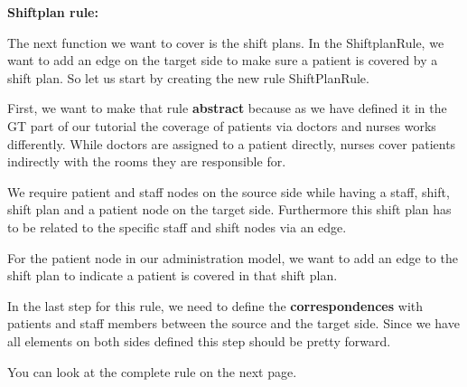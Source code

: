 \textbf{Shiftplan rule:}

The next function we want to cover is the shift plans. In the \textsf{ShiftplanRule}, we want to add an edge on the target side to make sure a patient is covered by a shift plan. So let us start by creating the new rule \textsf{ShiftPlanRule}.\newline

First, we want to make that rule \textbf{abstract} because as we have defined it in the GT part of our tutorial the coverage of patients via doctors and nurses works differently. While doctors are assigned to a patient directly, nurses cover patients indirectly with the rooms they are responsible for.

We require patient and staff nodes on the source side while having a staff, shift, shift plan and a patient node on the target side. Furthermore this shift plan has to be related to the specific staff and shift nodes via an edge.

For the patient node in our administration model, we want to add an edge to the shift plan to indicate a patient is covered in that shift plan.

In the last step for this rule, we need to define the \textbf{correspondences} with patients and staff members between the source and the target side. Since we have all elements on both sides defined this step should be pretty forward.\newline

You can look at the complete rule on the next page.

\clearpage


